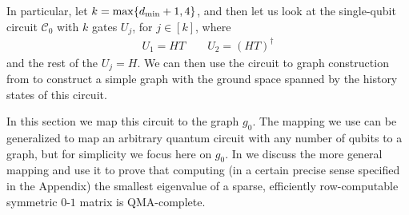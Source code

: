 \documentclass[../thesis-main/thesis-main]{subfiles}
\begin{document}
In particular, let $k = \max\{d_{\text{min}}+1, 4\}$, and then let us look at the single-qubit circuit $\mathcal{C}_0$ with $k$ gates $U_j$, for $j\in[k]$, where 
\begin{align*}
U_{1}=HT\qquad U_{2}=\left(HT\right)^{\dagger}
\end{align*}
and the rest of the $U_j=H$.  We can then use the circuit to graph construction from  to construct a simple graph with the ground space spanned by the history states of this circuit.  


In this section we map this circuit to the graph $g_{0}$. The mapping we use can be generalized to map an arbitrary quantum circuit with any number of qubits to a graph, but for simplicity we focus here on $g_{0}$. In  we discuss the more general mapping and use it to prove that computing (in a certain precise sense specified in the Appendix) the smallest eigenvalue of a sparse, efficiently row-computable symmetric $0$-$1$ matrix is QMA-complete.

\end{document}
